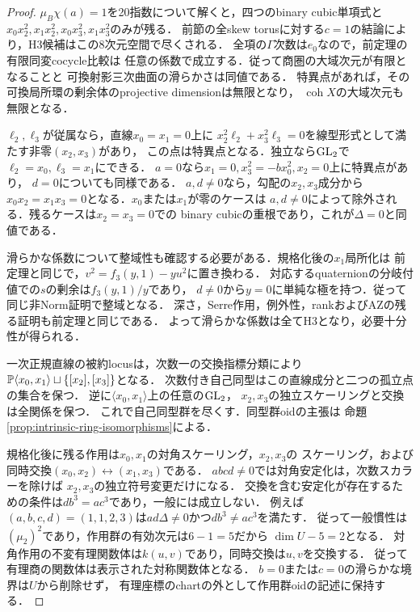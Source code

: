 \begin{proof}
$\mu_B\chi(a)=1$を20指数について解くと，四つのbinary cubic単項式と
$x_0x_2^2,x_1x_2^2,x_0x_3^2,x_1x_3^2$のみが残る．
前節の全skew torusに対する$c=1$の結論により，H3候補はこの8次元空間で尽くされる．
全項の$\Gamma$次数は$e_0$なので，前定理の有限同変cocycle比較は
任意の係数で成立する．従って商圏の大域次元が有限となることと
可換射影三次曲面の滑らかさは同値である．
特異点があれば，その可換局所環の剰余体のprojective dimensionは無限となり，
$\operatorname{coh}X$の大域次元も無限となる．

$\ell_2,\ell_3$が従属なら，直線$x_0=x_1=0$上に
$x_2^2\ell_2+x_3^2\ell_3=0$を線型形式として満たす非零$(x_2,x_3)$があり，
この点は特異点となる．独立なら$\operatorname{GL}_2$で$\ell_2=x_0,\ell_3=x_1$にできる．
$a=0$なら$x_1=0,x_3^2=-bx_0^2,x_2=0$上に特異点があり，
$d=0$についても同様である．
$a,d\ne0$なら，勾配の$x_2,x_3$成分から
$x_0x_2=x_1x_3=0$となる．$x_0$または$x_1$が零のケースは
$a,d\ne0$によって除外される．残るケースは$x_2=x_3=0$での
binary cubicの重根であり，これが$\Delta=0$と同値である．

滑らかな係数について整域性も確認する必要がある．規格化後の$x_1$局所化は
前定理と同じで，$v^2=f_3(y,1)-yu^2$に置き換わる．
対応するquaternionの分岐付値での$s$の剰余は$f_3(y,1)/y$であり，
$d\ne0$から$y=0$に単純な極を持つ．従って同じ非Norm証明で整域となる．
深さ，Serre作用，例外性，rankおよびAZの残る証明も前定理と同じである．
よって滑らかな係数は全てH3となり，必要十分性が得られる．

一次正規直線の被約locusは，次数一の交換指標分類により
$\mathbb P\langle x_0,x_1\rangle\sqcup\{[x_2],[x_3]\}$となる．
次数付き自己同型はこの直線成分と二つの孤立点の集合を保つ．
逆に$\langle x_0,x_1\rangle$上の任意の$\operatorname{GL}_2$，
$x_2,x_3$の独立スケーリングと交換は全関係を保つ．
これで自己同型群を尽くす．同型群oidの主張は
命題\ref{prop:intrinsic-ring-isomorphisms}による．

規格化後に残る作用は$x_0,x_1$の対角スケーリング，$x_2,x_3$の
スケーリング，および同時交換$(x_0,x_2)\leftrightarrow(x_1,x_3)$である．
$abcd\ne0$では対角安定化は，次数スカラーを除けば
$x_2,x_3$の独立符号変更だけになる．
交換を含む安定化が存在するための条件は$db^3=ac^3$であり，一般には成立しない．
例えば$(a,b,c,d)=(1,1,2,3)$は$ad\Delta\ne0$かつ$db^3\ne ac^3$を満たす．
従って一般慣性は$(\mu_2)^2$であり，作用群の有効次元は$6-1=5$だから
$\dim U-5=2$となる．
対角作用の不変有理関数体は$k(u,v)$であり，同時交換は$u,v$を交換する．
従って有理商の関数体は表示された対称関数体となる．
$b=0$または$c=0$の滑らかな境界は$U$から削除せず，
有理座標のchartの外として作用群oidの記述に保持する．
\end{proof}

